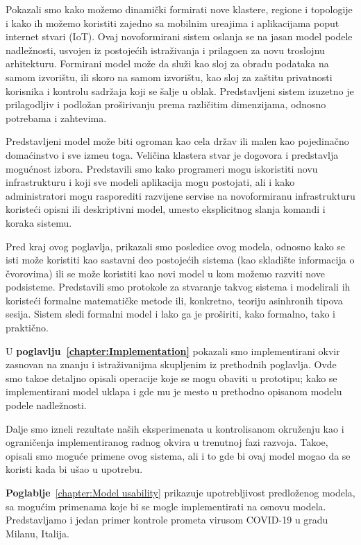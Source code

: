 Pokazali smo kako mo\v zemo dinami\v cki formirati nove klastere, regione i topologije i kako ih mo\v zemo koristiti zajedno sa mobilnim ure\dj ajima i aplikacijama poput internet stvari (IoT). Ovaj novoformirani sistem oslanja se na jasan model podele nadle\v znosti, usvojen iz postoje\'cih istra\v zivanja i prilago\dj en za novu troslojnu arhitekturu. Formirani model mo\v ze da slu\v zi kao sloj za obradu podataka na samom izvori\v stu, ili skoro na samom izvori\v stu, kao sloj za za\v stitu privatnosti korisnika i kontrolu sadr\v zaja koji se \v salje u oblak. Predstavljeni sistem izuzetno je prilagodljiv i podlo\v zan pro\v sirivanju prema razli\v citim dimenzijama, odnosno potrebama i zahtevima.

Predstavljeni model mo\v ze biti ogroman kao cela dr\v zav ili malen kao pojedina\v cno doma\'cinstvo i sve izme\dj u toga. Veli\v cina klastera stvar je dogovora i predstavlja mogu\'cnost izbora. Predstavili smo kako programeri mogu iskoristiti novu infrastrukturu i koji sve modeli aplikacija mogu postojati, ali i kako administratori mogu rasporediti razvijene servise na novoformiranu infrastrukturu koriste\'ci opisni ili deskriptivni model, umesto eksplicitnog slanja komandi i koraka sistemu.

Pred kraj ovog poglavlja, prikazali smo posledice ovog modela, odnosno kako se isti mo\v ze koristiti kao sastavni deo postoje\'cih sistema (kao skladi\v ste informacija o \v cvorovima) ili se mo\v ze koristiti kao novi model u kom mo\v zemo razviti nove podsisteme. Predstavili smo protokole za stvaranje takvog sistema i modelirali ih koriste\'ci formalne matemati\v cke metode ili, konkretno, teoriju asinhronih tipova sesija. Sistem sledi formalni model i lako ga je pro\v siriti, kako formalno, tako i prakti\v cno.

U \textbf{poglavlju~\ref{chapter:Implementation}} pokazali smo implementirani okvir zasnovan na znanju i istra\v zivanijma skupljenim iz prethodnih poglavlja. Ovde smo tako\dj e detaljno opisali operacije koje se mogu obaviti u prototipu; kako se implementirani model uklapa i gde mu je mesto u prethodno opisanom modelu podele nadle\v znosti.

Dalje smo izneli rezultate na\v sih eksperimenata u kontrolisanom okru\v zenju kao i ograni\v cenja implementiranog radnog okvira u trenutnoj fazi razvoja. Tako\dj e, opisali smo mogu\'ce primene ovog sistema, ali i to gde bi ovaj model mogao da se koristi kada bi u\v sao u upotrebu.

\textbf{Poglablje}~\ref{chapter:Model usability} prikazuje upotrebljivost predloženog modela, sa mogućim primenama koje bi se mogle implementirati na osnovu modela. Predstavljamo i jedan primer kontrole prometa virusom COVID-19 u gradu Milanu, Italija.

